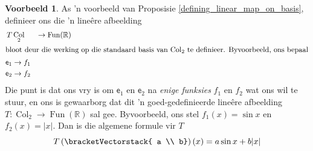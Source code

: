 \documentclass[a4paper,11pt]{book}
\theoremstyle{definition}
\newtheorem{example_environment}{Voorbeeld}[chapter]
\newcommand{\mat}[1]{\mathsf{#1}}
\newcommand{\cvector}[1]{\bracketVectorstack{#1}}
\newenvironment{example}
	{
		\begin{oframed}
		\begin{example_environment}
	}
	{
		\end{example_environment}
		\end{oframed}
	}
\DeclareMathOperator{\Fun}{Fun}
\DeclareMathOperator{\Col}{Col}
\begin{document}
\begin{example} As 'n voorbeeld van Proposisie
	\ref{defining_linear_map_on_basis}, definieer ons die 'n line{\^e}re
	afbeelding
	\begin{align*}
		T & \Col_2 & \rightarrow \Fun(\mathbb{R}) \\
		\intertext{bloot deur die werking op die standaard basis van
		$\Col_2$ te definieer. Byvoorbeeld, ons bepaal}
		\mat{e}_1 & \rightarrow f_1 \\
		\mat{e}_2 & \rightarrow f_2
	\end{align*}
	Die punt is dat ons vry is om $\mat{e}_1$ en $\mat{e}_2$ na \emph{enige
	funksies} $f_1$ en $f_2$ wat ons wil te stuur, en ons is gewaarborg dat
	dit 'n goed-gedefinieerde line{\^e}re afbeelding $T : \Col_2
	\rightarrow \Fun(\mathbb{R})$ sal gee. Byvoorbeeld, ons stel $f_1 (x) =
	\sin x$ en $f_2 (x) = |x|$. Dan is die algemene formule vir $T$
	\[
		T \left( \cvector{ a \\ b} \right) (x) = a \sin x + b |x|
	\]
\end{example}
\end{document}
